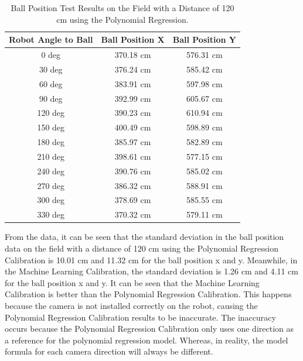 \begin{table}[H]

\caption{Ball Position Test Results on the Field with a Distance of 120 cm using the Polynomial Regression.}
\begin{center}

\begin{tabular}{|c|c|c|}
  \hline
  \rowcolor[HTML]{C0C0C0}
  \textbf{Robot Angle to Ball} & \textbf{Ball Position X} & \textbf{Ball Position Y} \\
  \hline
  0 deg            & 370.18 cm                & 576.31 cm            \\
  30 deg           & 376.24 cm                & 585.42 cm            \\
  60 deg           & 383.91 cm                & 597.98 cm            \\
  90 deg           & 392.99 cm                & 605.67 cm           \\
  120 deg           & 390.23 cm                & 610.94 cm           \\
  150 deg           & 400.49 cm                & 598.89 cm           \\
  180 deg           & 385.97 cm                & 582.89 cm           \\
  210 deg           & 398.61 cm                & 577.15 cm           \\
  240 deg           & 390.76 cm                & 585.02 cm           \\
  270 deg           & 386.32 cm                & 588.91 cm           \\
  300 deg           & 378.69 cm                & 585.55 cm           \\
  330 deg           & 370.32 cm                & 579.11 cm           \\
  \hline
\end{tabular}
\end{center}
\end{table}

From the data, it can be seen that the standard deviation in the ball position data on the field with a distance of 120 cm using the Polynomial Regression Calibration is 10.01 cm and 11.32 cm for the ball position x and y. Meanwhile, in the Machine Learning Calibration, the standard deviation is 1.26 cm and 4.11 cm for the ball position x and y. It can be seen that the Machine Learning Calibration is better than the Polynomial Regression Calibration. This happens because the camera is not installed correctly on the robot, causing the Polynomial Regression Calibration results to be inaccurate. The inaccuracy occurs because the Polynomial Regression Calibration only uses one direction as a reference for the polynomial regression model. Whereas, in reality, the model formula for each camera direction will always be different.

